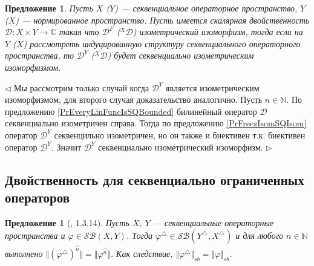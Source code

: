 \documentclass[12pt]{article}
\newtheorem{proposition}[theorem]{Предложение}
\newenvironment{proof}{\par $\triangleleft$}{$\triangleright$}
\begin{document}
\begin{proposition}\label{PrFreezDualityGetSQIsom}
Пусть $X$ ($Y$) --- секвенциальное операторное пространство, $Y$ ($X$) --- нормированное пространство. Пусть имеется скалярная двойственность $\mathcal{D}:X\times Y\to\mathbb{C}$ такая что $\mathcal{D}^F$ (${}^X\mathcal{D}$) 
изометрический изоморфизм, тогда если на $Y$ ($X$) рассмотреть индуцированную структуру секвенциального операторного пространства, то $\mathcal{D}^Y$ (${}^X\mathcal{D}$) будет секвенциально изометрическим изоморфизмом.
\end{proposition}
\begin{proof}
Мы рассмотрим только случай когда $\mathcal{D}^Y$ является изометрическим изоморфизмом, для второго случая доказательство аналогично. Пусть $n\in\mathbb{N}$. По предложению \ref{PrEveryLinFuncIsSQBounded} билинейный оператор $\mathcal{D}$ секвенциально изометричен справа. Тогда по предложению \ref{PrFreezIsomSQIsom} оператор $\mathcal{D}^Y$ секвенцильно изометричен, но он также и биективен т.к. биективен оператор 
$\mathcal{D}^Y$. Значит $\mathcal{D}^Y$ секвенциально изометрический изоморфизм. 
\end{proof}





























\subsection{Двойственность для секвенциально ограниченных операторов}

\begin{proposition}[\cite{LamOpFolgen}, 1.3.14]\label{PrDualSBOp}
Пусть $X$, $Y$ --- секвенциальные операторные пространства и $\varphi\in \mathcal{SB}(X,Y)$. Тогда $\varphi^\triangle \in\mathcal{SB}(Y^\triangle ,X^\triangle )$ и для любого $n\in\mathbb{N}$ выполнено 
$\Vert(\varphi^\triangle )^{\wideparen{n}}\Vert=\Vert\varphi^{\wideparen{n}}\Vert$. Как следствие, $\Vert\varphi^\triangle \Vert_{sb}=\Vert\varphi\Vert_{sb}$.
\end{proposition}
\end{document}
